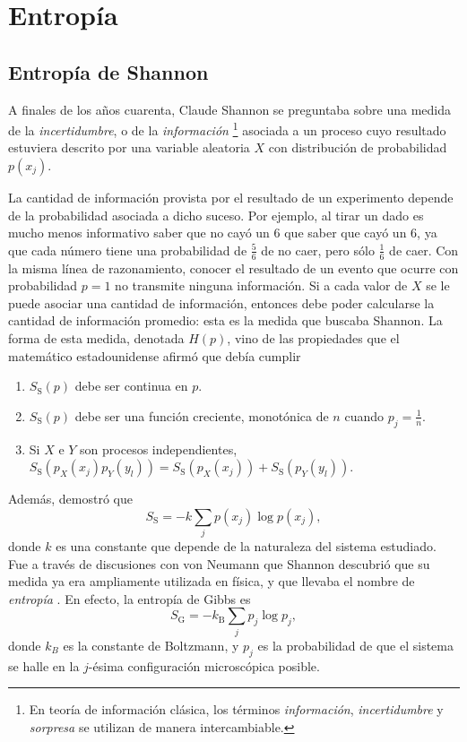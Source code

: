 \section{Entropía}
\label{sec:ch2_entropy}

\subsection{Entropía de Shannon}
A finales de los años cuarenta, Claude Shannon se preguntaba sobre una medida de la \textit{incertidumbre}, o de la \textit{información} \footnote{En teoría de información clásica, los términos \textit{información}, \textit{incertidumbre} y \textit{sorpresa} se utilizan de manera intercambiable.} asociada a un proceso cuyo resultado estuviera descrito por una variable aleatoria $X$ con distribución de probabilidad $p(x_{j})$.


La cantidad de información provista por el resultado de un experimento depende de la probabilidad asociada a dicho suceso. Por ejemplo, al tirar un dado es mucho menos informativo saber que no cayó un $6$ que saber que cayó un $6$, ya que cada número tiene una probabilidad de $\frac{5}{6}$ de no caer, pero sólo $\frac{1}{6}$ de caer. Con la misma línea de razonamiento, conocer el resultado de un evento que ocurre con probabilidad $p=1$ no transmite ninguna información. Si a cada valor de $X$ se le puede asociar una cantidad de información, entonces debe poder calcularse la cantidad de información promedio: esta es la medida que buscaba Shannon. La forma de esta medida, denotada $H(p)$, vino de las propiedades que el matemático estadounidense afirmó que debía cumplir \cite{Shannon,Wilde}
\begin{enumerate}
    \item $S_{\text{S}}(p)$ debe ser continua en $p$.
    \item $S_{\text{S}}(p)$ debe ser una función creciente, monotónica de $n$ cuando $p_{j}=\frac{1}{n}$.
    \item Si $X$ e $Y$ son procesos independientes, $S_{\text{S}}(p_{X}(x_{j})p_{Y}(y_{l}))=S_{\text{S}}(p_{X}(x_{j}))+S_{\text{S}}(p_{Y}(y_{l}))$.
\end{enumerate}
Además, demostró que
\begin{equation}\label{eq:ShannonEntropy}
    S_{\text{S}}=-k\sum_{j}p(x_{j})\log{p(x_{j})},
\end{equation}
donde $k$ es una constante que depende de la naturaleza del sistema estudiado. Fue a través de discusiones con von Neumann que Shannon descubrió que su medida ya era ampliamente utilizada en física, y que llevaba el nombre de \textit{entropía} \cite{McIrvine}. En efecto, la entropía de Gibbs es
\begin{equation}\label{eq:GibbsEntropy}
    S_{\text{G}}=-k_{\text{B}}\sum_{j}p_{j}\log{p_{j}},
\end{equation}
donde $k_{B}$ es la constante de Boltzmann, y $p_{j}$ es la probabilidad de que el sistema se halle en la $j$-ésima configuración microscópica posible.

